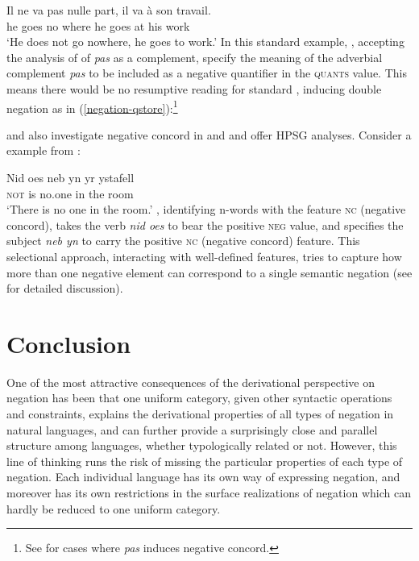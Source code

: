 \documentclass[output=paper
 	        ,biblatex
                ,babelshorthands
                ,newtxmath
                ,draftmode
                ,colorlinks, citecolor=brown
]{langscibook}
\begin{document}
\begin{exe}
\begin{xlist}
\ea
\gll Il ne va pas nulle part,         il va à son travail.\\
     he \NEG{} goes \NEG{} no where he goes at  his work\\
\glt `He does not go nowhere, he goes to work.'
\z
%
In this standard  example, \citet{Swart:02}, accepting
the analysis of \citet{Kim:00} of \textit{pas} as a complement,
specify the meaning of the adverbial complement \emph{pas} to be included as a negative quantifier in the \textsc{quants} value.
 This means there would be no resumptive
reading for standard , inducing double negation as in
(\ref{negation-qstore}):\footnote{See \citet{Swart:02} for cases where \textit{pas} induces negative
  concord.}

\ea
\label{negation-qstore}
\z

\citet{PK:99} and \citet{BJ:00} also  investigate negative concord in  and 
and offer HPSG analyses. Consider a  example from \citet{BJ:00}:

\ea
\gll Nid         oes neb yn yr ystafell\\
\textsc{not}    is no.one in the room\\
\glt `There is no one in the room.'
\z
\noindent \citet{BJ:00}, identifying n-words with the feature
\textsc{nc} (negative
concord),  takes the verb \emph{nid oes} to bear the positive \textsc{neg} value,
and specifies the subject \emph{neb yn} to carry the positive \textsc{nc} (negative
concord) feature. This selectional approach, interacting with
well-defined features, tries to capture how more than one
negative element can correspond to a single semantic negation (see
\citet{BJ:00} for detailed discussion).



\section{Conclusion}

One of the most attractive consequences of the derivational perspective on negation has been that
one uniform category, given other syntactic operations and constraints, explains the derivational
properties of all types of negation in natural languages, and can further provide a surprisingly
close and parallel structure among languages, whether typologically related or not. However, this
line of thinking runs the risk of missing the particular properties of each type of negation. Each
individual language has its own way of expressing negation, and moreover has its own restrictions in
the surface realizations of negation which can hardly be reduced to one uniform category.



\end{xlist}
\end{exe}
\end{document}
